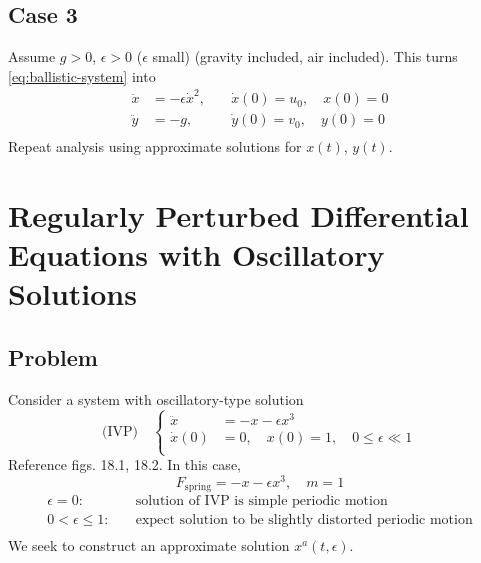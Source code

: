 \documentclass[12pt,twoside]{article}
\begin{document}
\subsection{Case 3}
Assume $g>0$, $\epsilon>0$ ($\epsilon$ small) (gravity included, air included).
This turns \cref{eq:ballistic-system} into
\begin{equation*}
  \begin{aligned}
    \ddot{x}&=-\epsilon\dot{x}^2, &\quad \dot{x}(0)=u_0,\quad x(0)=0 \\
    \ddot{y}&=-g, &\quad \dot{y}(0)=v_0,\quad y(0)=0 \\
  \end{aligned}
\end{equation*}
Repeat analysis using approximate solutions for $x(t)$, $y(t)$.

\section{Regularly Perturbed Differential Equations with Oscillatory Solutions}
\subsection{Problem}
Consider a system with oscillatory-type solution
\begin{equation*} \text{(IVP)} \quad \left\{
  \begin{aligned}
    \ddot{x} &= -x-\epsilon x^3 \\
    \dot{x}(0)&=0,\quad x(0)=1,\quad 0\le\epsilon\ll1 \\
  \end{aligned}  \right.
\end{equation*}
Reference figs. 18.1, 18.2. In this case,
$$F_{\text{spring}}=-x-\epsilon x^3,\quad m=1$$
\begin{equation*}
  \begin{aligned}
    \epsilon=0:&\quad \text{solution of IVP is simple periodic motion} \\
    0<\epsilon\le1:&\quad \text{expect solution to be slightly distorted periodic motion} \\
  \end{aligned}
\end{equation*}
We seek to construct an approximate solution $x^a(t,\epsilon)$.
\end{document}
